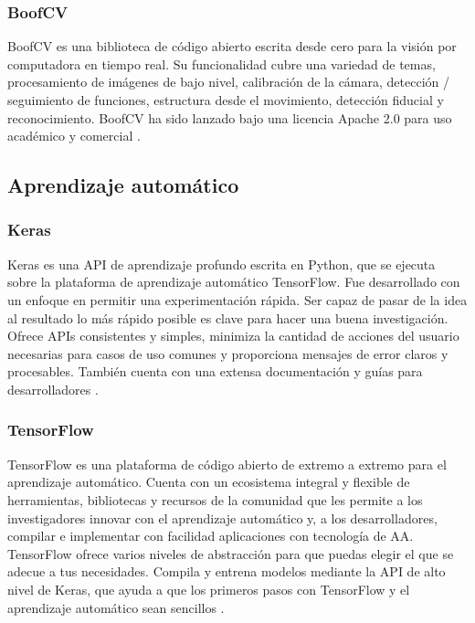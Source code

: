 \subsubsection*{BoofCV}
BoofCV es una biblioteca de código abierto escrita desde cero para la visión por computadora en tiempo real. Su funcionalidad cubre una variedad de temas, procesamiento de imágenes de bajo nivel, calibración de la cámara, detección / seguimiento de funciones, estructura desde el movimiento, detección fiducial y reconocimiento. BoofCV ha sido lanzado bajo una licencia Apache 2.0 para uso académico y comercial \cite{BoofCV}.

\subsection*{Aprendizaje automático}
\subsubsection*{Keras}
Keras es una API de aprendizaje profundo escrita en Python, que se ejecuta sobre la plataforma de aprendizaje automático TensorFlow. Fue desarrollado con un enfoque en permitir una experimentación rápida. Ser capaz de pasar de la idea al resultado lo más rápido posible es clave para hacer una buena investigación. Ofrece APIs consistentes y simples, minimiza la cantidad de acciones del usuario necesarias para casos de uso comunes y proporciona mensajes de error claros y procesables. También cuenta con una extensa documentación y guías para desarrolladores \cite{Keras}.

\subsubsection*{TensorFlow}
TensorFlow es una plataforma de código abierto de extremo a extremo para el aprendizaje automático. Cuenta con un ecosistema integral y flexible de herramientas, bibliotecas y recursos de la comunidad que les permite a los investigadores innovar con el aprendizaje automático y, a los desarrolladores, compilar e implementar con facilidad aplicaciones con tecnología de AA. TensorFlow ofrece varios niveles de abstracción para que puedas elegir el que se adecue a tus necesidades. Compila y entrena modelos mediante la API de alto nivel de Keras, que ayuda a que los primeros pasos con TensorFlow y el aprendizaje automático sean sencillos \cite{TensorFlow}.

